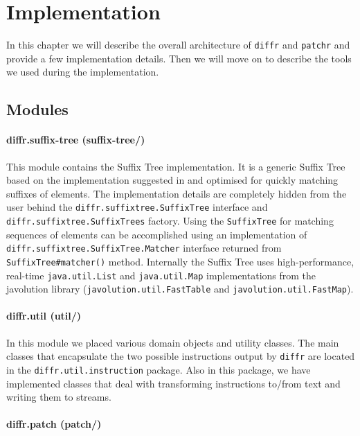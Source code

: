 \section{Implementation}

In this chapter we will describe the overall architecture of \texttt{diffr} and \texttt{patchr} and provide a few implementation details. Then we will move on to describe the tools we used during the implementation.

\subsection{Modules}

\paragraph{diffr.suffix-tree (suffix-tree/)}
This module contains the Suffix Tree implementation. It is a generic Suffix Tree based on the implementation suggested in \cite{Ukkonen95} and optimised for quickly matching suffixes of elements. The implementation details are completely hidden from the user behind the \texttt{diffr.suffixtree.SuffixTree} interface and \texttt{diffr.suffixtree.SuffixTrees} factory. Using the \texttt{SuffixTree} for matching sequences of elements can be accomplished using an implementation of \texttt{diffr.suffixtree.SuffixTree.Matcher} interface returned from \texttt{SuffixTree\#matcher()} method. Internally the Suffix Tree uses high-performance, real-time \texttt{java.util.List} and \texttt{java.util.Map} implementations from the javolution library (\texttt{javolution.util.FastTable} and \texttt{javolution.util.FastMap})\cite{javolution}. 

\paragraph{diffr.util (util/)}
In this module we placed various domain objects and utility classes. The main classes that encapsulate the two possible instructions output by \texttt{diffr} are located in the \texttt{diffr.util.instruction} package. Also in this package, we have implemented classes that deal with transforming instructions to/from text and writing them to streams.

\paragraph{diffr.patch (patch/)} 

